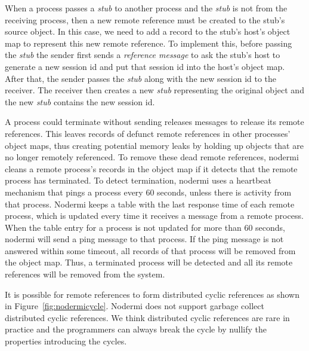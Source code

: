 When a process passes a \emph{stub} to another process and the \emph{stub}
is not from the receiving process, then a new remote reference must be created
to the stub's source object.  In this case, we need to add a record to
the stub's host's object map to represent this new remote reference.
To implement this, before passing the \emph{stub} the sender first
sends a \emph{reference message} to ask the stub's host to generate a
new session id and put that session id into the host's object map.  After
that, the sender passes the \emph{stub} along with the new session id to
the receiver.  The receiver then creates a new \emph{stub} representing
the original object and the new \emph{stub} contains the new session id.

A process could terminate without sending releases messages to release
its remote references.  This leaves records of defunct remote references
in other processes' object maps, thus creating potential memory leaks by
holding up objects that are no longer remotely referenced.  To remove
these dead remote references, nodermi cleans a remote process's records
in the object map if it detects that the remote process has terminated.
To detect termination, nodermi uses a heartbeat mechanism that pings
a process every 60 seconds, unless there is activity from that process.
Nodermi keeps a table with the last response time of each remote process,
which is updated every time it receives a message from a
remote process.  When the table entry for a process is not updated for
more than 60 seconds, nodermi will send a ping message to that process.
If the ping message is not answered within some timeout, all records of that
process will be removed from the object map.  Thus, a terminated process
will be detected and all its remote references will be removed from the system.

\nodrmicyclefig{}

It is possible for remote references to form distributed cyclic references as shown
in Figure~\ref{fig:nodermicycle}.
Nodermi does not support garbage collect distributed cyclic references.
We think distributed cyclic references are rare in practice and the
programmers can always break the cycle by nullify the properties
introducing the cycles.





